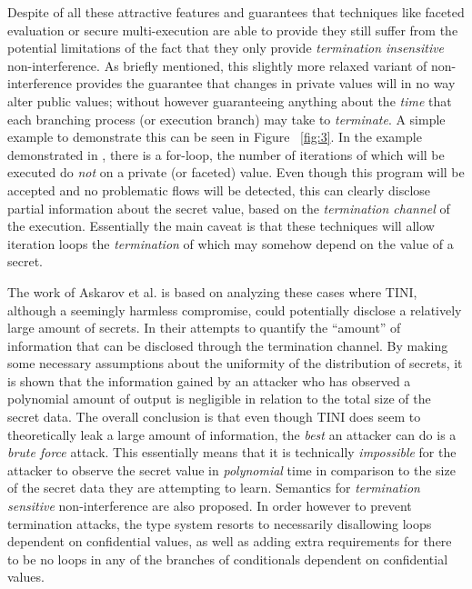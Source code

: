 \documentclass[preprint]{sigplanconf}
\begin{document}
Despite of all these attractive features and guarantees that techniques like faceted evaluation or secure multi-execution are able to provide they still suffer from the potential limitations of the fact that they only provide \textit{termination insensitive} non-interference. As briefly mentioned, this slightly more relaxed variant of non-interference provides the guarantee that changes in private values will in no way alter public values; without however guaranteeing anything about the \textit{time} that each branching process (or execution branch) may take to \textit{terminate}. A simple example to demonstrate this can be seen in Figure ~\ref{fig:3}. In the example demonstrated in \cite{askarov2008termination}, there is a for-loop, the number of iterations of which will be executed do \textit{not} on a private (or faceted) value. Even though this program will be accepted and no problematic flows will be detected, this can clearly disclose partial information about the secret value, based on the \textit{termination channel} of the execution. Essentially the main caveat is that these techniques will allow iteration loops the \textit{termination} of which may somehow depend on the value of a secret.

The work of Askarov et al. \cite{askarov2008termination} is based on analyzing these cases where TINI, although a seemingly harmless compromise, could potentially disclose a relatively large amount of secrets. In their attempts to quantify the ``amount'' of information that can be disclosed through the termination channel. By making some necessary assumptions about the uniformity of the distribution of secrets, it is shown that the information gained by an attacker who has observed a polynomial amount of output is negligible in relation to the total size of the secret data. The overall conclusion is that even though TINI does seem to theoretically leak a large amount of information, the \textit{best} an attacker can do is a \textit{brute force} attack. This essentially means that it is technically \textit{impossible} for the attacker to observe the secret value in \textit{polynomial} time in comparison to the size of the secret data they are attempting to learn. Semantics for \textit{termination sensitive} \cite{barthe2006preventing} non-interference are also proposed. In order however to prevent termination attacks, the type system resorts to necessarily disallowing loops dependent on confidential values, as well as adding extra requirements for there to be no loops in any of the branches of conditionals dependent on confidential values.
\end{document}
